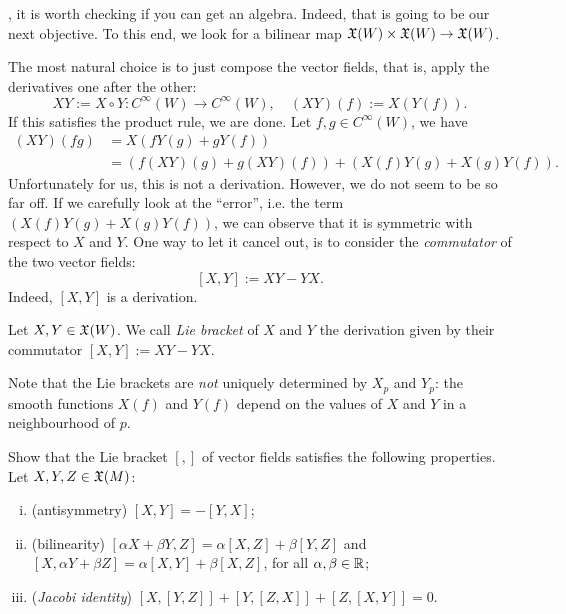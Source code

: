 , it is worth checking if you can get an algebra.
Indeed, that is going to be our next objective.
To this end, we look for a bilinear map $\mathfrak{X}(W)\times\mathfrak{X}(W) \to \mathfrak{X}(W)$.

The most natural choice is to just compose the vector fields, that is, apply the derivatives one after the other:
\begin{equation}
  X Y := X \circ Y : C^\infty(W) \to C^\infty(W), \quad
  (X Y)(f) := X(Y(f)).
\end{equation}
If this satisfies the product rule, we are done.
Let $f,g\in C^\infty(W)$, we have
\begin{align}
  (X Y)(fg) & = X(fY(g) + gY(f))                                                       \\
            & = \left(f(X Y)(g) + g(X Y)(f)\right) + \left( X(f)Y(g) +X(g)Y(f)\right).
\end{align}
Unfortunately for us, this is not a derivation. However, we do not seem to be so far off.
If we carefully look at the ``error'', i.e. the term $\left( X(f)Y(g) +X(g)Y(f)\right)$, we can observe that it is symmetric with respect to $X$ and $Y$.
One way to let it cancel out, is to consider the \emph{commutator} of the two vector fields:
\begin{equation}\label{def:commutator}
  [X,Y] := X Y - Y X.
\end{equation}
Indeed, $[X,Y]$ is a derivation.

\begin{definition}
  Let $X,Y\in\mathfrak{X}(W)$. We call \emph{Lie bracket} of $X$ and $Y$ the derivation given by their commutator $[X,Y] := X Y - Y X$.
\end{definition}

\begin{remark}
  Note that the Lie brackets are \emph{not} uniquely determined by $X_p$ and $Y_p$: the smooth functions $X(f)$ and $Y(f)$ depend on the values of $X$ and $Y$ in a neighbourhood of $p$.
\end{remark}

\begin{exercise}\label{ex:vfliealgebra}
  Show that the Lie bracket $[,]$ of vector fields satisfies the following properties. Let $X,Y,Z\in\mathfrak{X}(M)$:
  \begin{enumerate}[(i)]
    \item (antisymmetry) $[X, Y] = - [Y, X]$;
    \item (bilinearity) $[\alpha X + \beta Y, Z] = \alpha [X, Z] + \beta [Y, Z]$ and $[X, \alpha Y + \beta Z] = \alpha [X, Y] + \beta [X, Z]$, for all $\alpha,\beta \in\mathbb{R}$;
    \item (\emph{Jacobi identity}) $[X,[Y,Z]] + [Y,[Z,X]] + [Z,[X,Y]] = 0$.
  \end{enumerate}
\end{exercise}

